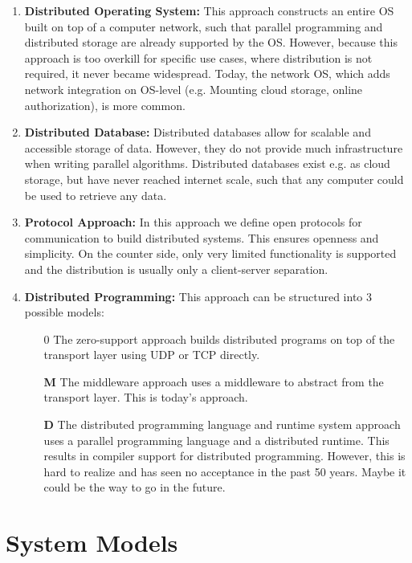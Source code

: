 \begin{enumerate}
    \item \textbf{Distributed Operating System:} This approach constructs an entire \ac{OS} built on top of a computer network, such that parallel programming and distributed storage are already supported by the \ac{OS}. However, because this approach is too overkill for specific use cases, where distribution is not required, it never became widespread. Today, the network \ac{OS}, which adds network integration on \ac{OS}-level (e.g. Mounting cloud storage, online authorization), is more common.
    \item \textbf{Distributed Database:} Distributed databases allow for scalable and accessible storage of data. However, they do not provide much infrastructure when writing parallel algorithms. Distributed databases exist e.g. as cloud storage, but have never reached internet scale, such that any computer could be used to retrieve any data.
    \item \textbf{Protocol Approach:} In this approach we define open protocols for communication to build distributed systems. This ensures openness and simplicity. On the counter side, only very limited functionality is supported and the distribution is usually only a client-server separation.
    \item \textbf{Distributed Programming:} This approach can be structured into 3 possible models:
          \begin{itemize}
              \item[$0$] The zero-support approach builds distributed programs on top of the transport layer using UDP or TCP directly.
              \item[\textbf{M}] The middleware approach uses a middleware to abstract from the transport layer. This is today's approach.
              \item[\textbf{D}] The distributed programming language and runtime system approach uses a parallel programming language and a distributed runtime. This results in compiler support for distributed programming. However, this is hard to realize and has seen no acceptance in the past 50 years. Maybe it could be the way to go in the future.
          \end{itemize}
\end{enumerate}

\section{System Models}

